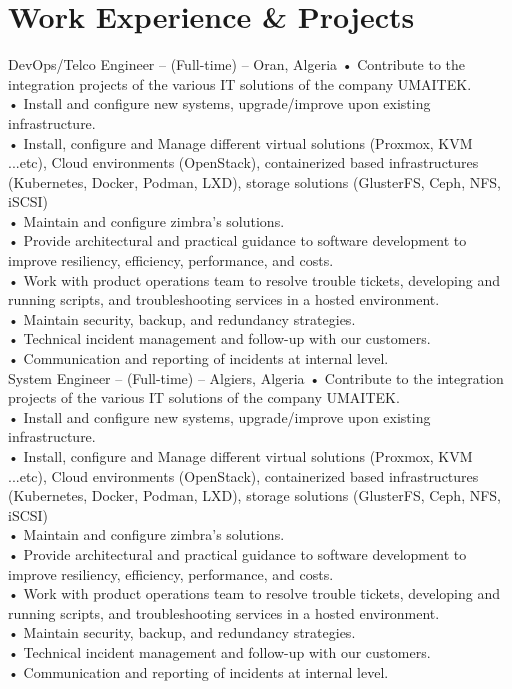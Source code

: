 \documentclass{cv}
\begin{document}
\section{Work Experience \& Projects}
{DevOps/Telco Engineer -- (Full-time)}
{\lab -- Oran, Algeria\vspace{.3cm}}
{
    • Contribute to the integration projects of the various IT solutions of the company UMAITEK.\\
    • Install and configure new systems, upgrade/improve upon existing infrastructure.\\
    • Install, configure and Manage different virtual solutions (Proxmox, KVM ...etc), Cloud environments (OpenStack), containerized based infrastructures (Kubernetes, Docker, Podman, LXD), storage solutions (GlusterFS, Ceph, NFS, iSCSI)  \\
    • Maintain and configure zimbra's solutions.\\
    • Provide architectural and practical guidance to software development to improve resiliency, efficiency, performance, and costs.\\
    • Work with product operations team to resolve trouble tickets, developing and running scripts, and troubleshooting services in a hosted environment.\\
    • Maintain security, backup, and redundancy strategies.\\
    • Technical incident management and follow-up with our customers.\\
    • Communication and reporting of incidents at internal level.\\

}
{System Engineer -- (Full-time)}
{\umtk -- Algiers, Algeria\vspace{.3cm}}
{
    • Contribute to the integration projects of the various IT solutions of the company UMAITEK.\\
    • Install and configure new systems, upgrade/improve upon existing infrastructure.\\
    • Install, configure and Manage different virtual solutions (Proxmox, KVM ...etc), Cloud environments (OpenStack), containerized based infrastructures (Kubernetes, Docker, Podman, LXD), storage solutions (GlusterFS, Ceph, NFS, iSCSI)  \\
    • Maintain and configure zimbra's solutions.\\
    • Provide architectural and practical guidance to software development to improve resiliency, efficiency, performance, and costs.\\
    • Work with product operations team to resolve trouble tickets, developing and running scripts, and troubleshooting services in a hosted environment.\\
    • Maintain security, backup, and redundancy strategies.\\
    • Technical incident management and follow-up with our customers.\\
    • Communication and reporting of incidents at internal level.\\

}
\end{document}
